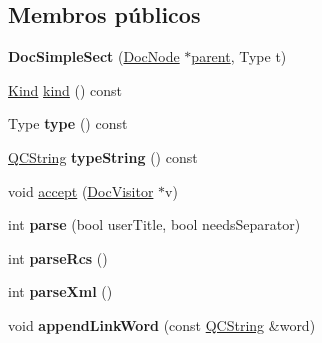 \subsection*{Membros públicos}
\begin{DoxyCompactItemize}
\item 
\hypertarget{class_doc_simple_sect_a6c03ea1ae4f562b5eee3b48e7a4b2d15}{{\bfseries Doc\-Simple\-Sect} (\hyperlink{class_doc_node}{Doc\-Node} $\ast$\hyperlink{class_doc_node_abd7f070d6b0a38b4da71c2806578d19d}{parent}, Type t)}\label{class_doc_simple_sect_a6c03ea1ae4f562b5eee3b48e7a4b2d15}

\item 
\hyperlink{class_doc_node_aa10c9e8951b8ccf714a59ec321bdac5b}{Kind} \hyperlink{class_doc_simple_sect_aa9d037bed9f9a083d0cd01485637d843}{kind} () const 
\item 
\hypertarget{class_doc_simple_sect_afbd0fa31db28593e9669c3c56711c0a7}{Type {\bfseries type} () const }\label{class_doc_simple_sect_afbd0fa31db28593e9669c3c56711c0a7}

\item 
\hypertarget{class_doc_simple_sect_a03c324f066838fd9e960d88136aea8d9}{\hyperlink{class_q_c_string}{Q\-C\-String} {\bfseries type\-String} () const }\label{class_doc_simple_sect_a03c324f066838fd9e960d88136aea8d9}

\item 
void \hyperlink{class_doc_simple_sect_a7ba716e854ae2f8f87a4eb2140e302b6}{accept} (\hyperlink{class_doc_visitor}{Doc\-Visitor} $\ast$v)
\item 
\hypertarget{class_doc_simple_sect_a6a59be2fad3a5ecb0741466bed4f2194}{int {\bfseries parse} (bool user\-Title, bool needs\-Separator)}\label{class_doc_simple_sect_a6a59be2fad3a5ecb0741466bed4f2194}

\item 
\hypertarget{class_doc_simple_sect_a5c5308a4245ba3068b4a075efac3c0bd}{int {\bfseries parse\-Rcs} ()}\label{class_doc_simple_sect_a5c5308a4245ba3068b4a075efac3c0bd}

\item 
\hypertarget{class_doc_simple_sect_a80866a0f93fec97bbcf5b54a48fd8ead}{int {\bfseries parse\-Xml} ()}\label{class_doc_simple_sect_a80866a0f93fec97bbcf5b54a48fd8ead}

\item 
\hypertarget{class_doc_simple_sect_a5be8d002fb7efa3fcae60d242d2c03cb}{void {\bfseries append\-Link\-Word} (const \hyperlink{class_q_c_string}{Q\-C\-String} \&word)}\label{class_doc_simple_sect_a5be8d002fb7efa3fcae60d242d2c03cb}

\end{DoxyCompactItemize}
